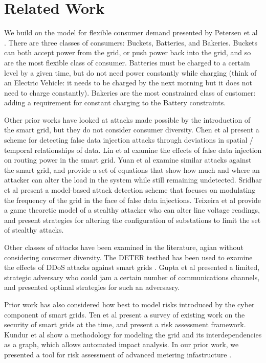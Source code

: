 \documentclass[conference]{IEEEtran}
\begin{document}
\section{Related Work}
\label{Related Work}

We build on the model for flexible consumer demand presented by Petersen et al \cite{petersen2013taxonomy}. There are three classes of consumers: Buckets, Batteries, and Bakeries. Buckets can both accept power from the grid, or push power back into the grid, and so are the most flexible class of consumer. Batteries must be charged to a certain level by a given time, but do not need power constantly while charging (think of an Electric Vehicle: it needs to be charged by the next morning but it does not need to charge constantly). Bakeries are the most constrained class of customer: adding a requirement for constant charging to the Battery constraints.

Other prior works have looked at attacks made possible by the introduction of the smart grid, but they do not consider consumer diversity. Chen et al \cite{chen2015detection} present a scheme for detecting false data injection attacks through deviations in spatial / temporal relationships of data. Lin et al \cite{lin2012false} examine the effects of false data injection on routing power in the smart grid. Yuan et al \cite{yuan2011modeling} examine similar attacks against the smart grid, and provide a set of equations that show how much and where an attacker can alter the load in the system while still remaining undetected. Sridhar et al \cite{sridhar2014model} present a model-based attack detection scheme that focuses on modulating the frequency of the grid in the face of false data injections. Teixeira et al \cite{teixeira2014security} provide a game theoretic model of a stealthy attacker who can alter line voltage readings, and present strategies for altering the configuration of substations to limit the set of stealthy attacks. 

Other classes of attacks have been examined in the literature, agian without considering consumer diversity. The DETER testbed has been used to examine the effects of DDoS attacks against smart grids \cite{hussain2012ncs}. Gupta et al \cite{gupta2010optimal} presented a limited, strategic adversary who could jam a certain number of communications channels, and presented optimal strategies for such an adversasry. 

Prior work has also considered how best to model risks introduced by the cyber component of smart grids. Ten et al \cite{ten2010cybersecurity} present a survey of existing work on the security of smart grids at the time, and present a risk assessment framework. Kundur et al \cite{kundur2010towards} show a methodology for modeling the grid and its interdependencies as a graph, which allows automated impact analysis. In our prior work, we presented a tool for risk assessment of advanced metering infastructure \cite{shawly2014risk}.
\end{document}
